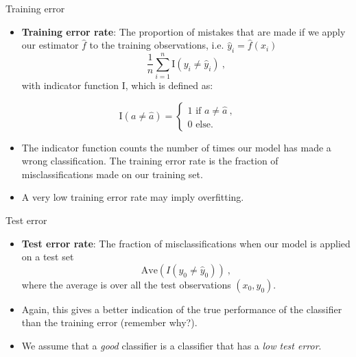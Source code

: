 \documentclass[10pt,ignorenonframetext,]{beamer}
\providecommand{\tightlist}{%
  \setlength{\itemsep}{0pt}\setlength{\parskip}{0pt}}
\begin{document}
\begin{frame}

\begin{block}{Training error}

\begin{itemize}
\tightlist
\item
  \textbf{Training error rate}: The proportion of mistakes that are made
  if we apply our estimator \(\hat{f}\) to the training observations,
  i.e. \(\hat{y}_i=\hat{f}(x_i)\)
  \[\frac{1}{n}\sum_{i=1}^n \text{I}(y_i \neq \hat{y}_i) \ ,\] with
  indicator function I, which is defined as:
\end{itemize}

\[\text{I}(a\neq\hat{a}) = \begin{cases} 1 \text{ if } a \neq \hat{a} \ , \\ 
0 \text{ else. } \end{cases}\]

\begin{itemize}
\item
  The indicator function counts the number of times our model has made a
  wrong classification. The training error rate is the fraction of
  misclassifications made on our training set.
\item
  A very low training error rate may imply overfitting.
\end{itemize}

\end{block}

\end{frame}

\begin{frame}

\begin{block}{Test error}

\vspace{2mm}

\begin{itemize}
\item
  \textbf{Test error rate}: The fraction of misclassifications when our
  model is applied on a test set
  \[\text{Ave}(I(y_0\neq \hat{y}_0)) \ ,\] where the average is over all
  the test observations \((x_0,y_0)\).
\item
  Again, this gives a better indication of the true performance of the
  classifier than the training error (remember why?).
\item
  We assume that a \emph{good} classifier is a classifier that has a
  \emph{low test error}.
\end{itemize}

\end{block}

\end{frame}
\end{document}
